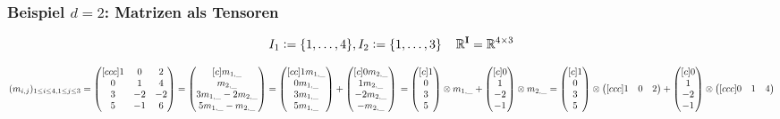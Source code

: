 \documentclass[11pt]{article} %
\theoremstyle{definition}
\numberwithin{equation}{section}
\begin{document}
\subsubsection{Beispiel $d=2$: Matrizen als Tensoren}
\begin{changemargin}{0pt}{0pt}

\[ I_{1} := \{1,\dots,4\}, I_{2} := \{1,\dots,3\} \hspace{4mm} \mathbb{R}^{\mathbf{I}} = \mathbb{R}^{4\times 3}\]

$
(m_{i,j})_{1 \leq i \leq 4, 1 \leq j \leq 3} =
\begin{pmatrix}[ccc]
  1 & 0 & 2 \\
  0 & 1 & 4 \\
  3 & -2 & -2 \\
  5 & -1 & 6
\end{pmatrix} =
\begin{pmatrix}[c]
  m_{1,\_} \\
  m_{2,\_} \\
  3m_{1,\_} -2m_{2,\_} \\
  5m_{1,\_} -m_{2,\_}
\end{pmatrix} =
\begin{pmatrix}[cc]
  1m_{1,\_} \\
  0m_{1,\_} \\
  3m_{1,\_} \\
  5m_{1,\_}
\end{pmatrix} +
\begin{pmatrix}[c]
  0m_{2,\_} \\
  1m_{2,\_} \\
  -2m_{2,\_} \\
  -m_{2,\_}
\end{pmatrix} \\
=
\begin{pmatrix}[c]
  1 \\
  0 \\
  3 \\
  5
\end{pmatrix} \otimes m_{1,\_} +
\begin{pmatrix}[c]
  0 \\
  1 \\
  -2 \\
  -1
\end{pmatrix} \otimes m_{2,\_} =
\begin{pmatrix}[c]
  1 \\
  0 \\
  3 \\
  5
\end{pmatrix} \otimes
\begin{pmatrix}[ccc]
  1 & 0 & 2 \\
\end{pmatrix} +
\begin{pmatrix}[c]
  0 \\
  1 \\
  -2 \\
  -1
\end{pmatrix} \otimes
\begin{pmatrix}[ccc]
  0 & 1 & 4
\end{pmatrix}
$


\end{changemargin}
\end{document}
